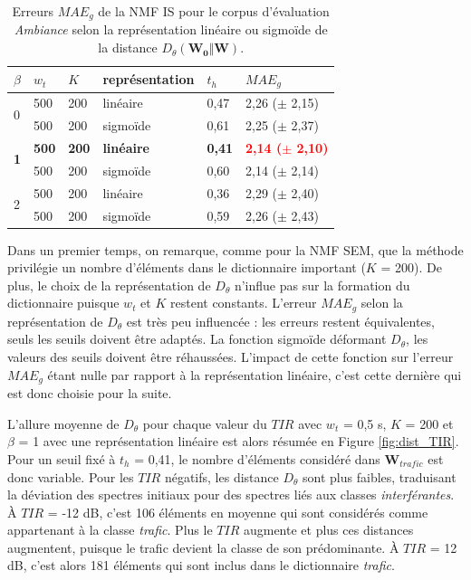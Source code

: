 \begin{table}[h]
\centering
\caption{Erreurs $MAE_g$ de la NMF IS pour le corpus d'évaluation \textit{Ambiance} selon la représentation linéaire ou sigmoïde de la distance $D_{\theta}(\mathbf{W_0}\Vert \mathbf{W})$.}
\label{tab:erreur_ambiance_IS}
\begin{tabular}{C{1.2cm}C{1.2cm}C{1.2cm}C{2.5cm}C{1.2cm}C{2.5cm}}
\toprule
{} & $w_t$ & $K$ & représentation & $t_h$ & $MAE_g$ \\ \toprule
{} & 500 & 200 & linéaire & 0,47 & 2,26 ($\pm$ 2,15) \\
 & 500 & 200 & sigmoïde & 0,61 & 2,25 ($\pm$ 2,37) \\ \midrule
{} & \textbf{500} & \textbf{200} & \textbf{linéaire} & \textbf{0,41} & \textbf{\textcolor{red}{2,14 ($\pm$ 2,10)}} \\
 & 500 & 200 & sigmoïde & 0,60 & 2,14 ($\pm$ 2,14) \\ \midrule
{} & 500 & 200 & linéaire & 0,36 & 2,29 ($\pm$ 2,40)\\
 & 500 & 200 & sigmoïde &  0,59 & 2,26 ($\pm$ 2,43)  \\
\bottomrule
\end{tabular}
\end{table}

Dans un premier temps, on remarque, comme pour la NMF SEM, que la méthode privilégie un nombre d'éléments dans le dictionnaire important ($K$ = 200). De plus, le choix de la représentation de $D_{\theta}$ n'influe pas sur la formation du dictionnaire puisque $w_t$ et $K$ restent constants.
L'erreur $MAE_g$ selon la représentation de $D_{\theta}$ est très peu influencée : les erreurs restent équivalentes, seuls les seuils doivent être adaptés. La fonction sigmoïde déformant $D_{\theta}$, les valeurs des seuils doivent être réhaussées. L'impact de cette fonction sur l'erreur $MAE_g$ étant nulle par rapport à la représentation linéaire, c'est cette dernière qui est donc choisie pour la suite.

L'allure moyenne de $D_{\theta}$ pour chaque valeur du $TIR$ avec $w_t$ = 0,5 s, $K$ = 200 et $\beta$ = 1 avec une représentation linéaire est alors résumée en Figure \ref{fig:dist_TIR}. Pour un seuil fixé à $t_h$ = 0,41, le nombre d'éléments considéré dans $\mathbf{W}_{trafic}$ est donc variable. Pour les $TIR$ négatifs, les distance $D_{\theta}$ sont plus faibles, traduisant la déviation des spectres initiaux pour des spectres liés aux classes \textit{interférantes}. À $TIR$ = -12 dB, c'est 106 éléments en moyenne qui sont considérés comme appartenant à la classe \textit{trafic}. Plus le $TIR$ augmente et plus ces distances augmentent, puisque le trafic devient la classe de son prédominante. À $TIR$ = 12 dB, c'est alors 181 éléments qui sont inclus dans le dictionnaire \textit{trafic}.

